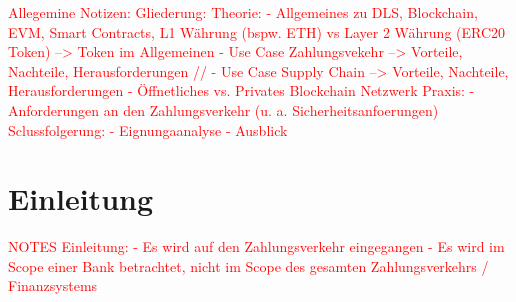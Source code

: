 
\noindent %

\begin{flushleft}
    
    \textcolor{red}{Allegemine Notizen:\break
    Gliederung:\break
    Theorie:\break
    - Allgemeines zu DLS, Blockchain, EVM, Smart Contracts, L1 Währung (bspw. ETH) vs Layer 2 Währung (ERC20 Token) --> Token im Allgemeinen\break
    - Use Case Zahlungsvekehr --> Vorteile, Nachteile, Herausforderungen\break
    // - Use Case Supply Chain --> Vorteile, Nachteile, Herausforderungen \break
    - Öffnetliches vs. Privates Blockchain Netzwerk\break
    Praxis:\break
    - Anforderungen an den Zahlungsverkehr (u. a. Sicherheitsanfoerungen)\break
    Sclussfolgerung:\break
    - Eignungaanalyse\break
    - Ausblick\break
    }
\end{flushleft}
\section{Einleitung}


\begin{flushleft}
    \textcolor{red}{
        NOTES Einleitung:\break
- Es wird auf den Zahlungsverkehr eingegangen\break
- Es wird im Scope einer Bank betrachtet, nicht im Scope des gesamten Zahlungsverkehrs / Finanzsystems
    }
\end{flushleft}

\bigbreak